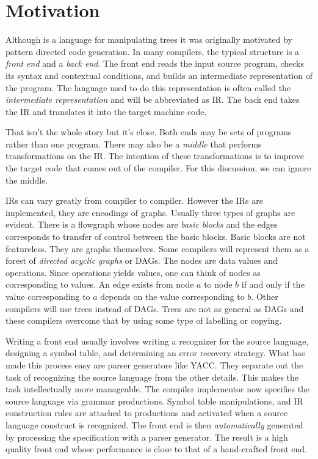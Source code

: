 \section{Motivation}

Although \Twiglang{} is a language for manipulating trees
it was originally motivated by
pattern directed code generation.  In many compilers, the typical
structure is a {\sl front end} and a {\sl back end}.  The front end reads
the input source program, checks its syntax and contextual conditions,
and builds an intermediate representation of the program.
The language used to do this representation is often called the
{\it intermediate representation} and will be abbreviated as IR.
The back end
takes the IR and translates it into the target machine code.

That isn't the whole story but it's close.  Both ends may be 
sets of programs rather than one
program.  There may also be a
{\it middle} that performs transformations on the
IR.  The intention of these
transformations is to improve the target code that comes out of the compiler.
For this discussion, we can ignore the middle.

IRs can vary greatly from compiler to compiler.
However the IRs are implemented, they are encodings of graphs.
Usually three types of graphs are evident\cite{dragon}.
There is a flowgraph whose nodes are {\sl basic blocks} and
the edges corresponds to transfer of control between the basic blocks.
Basic blocks are not featureless.  They are graphs themselves.
Some compilers will represent them as a forest of
{\it directed acyclic graphs} or DAGs.
The nodes are data values and operations.
Since operations yields values, one can think of nodes as
corresponding to values.  An edge exists from node $a$ to
node $b$ if and only if the value corresponding to $a$ depends on the
value corresponding to $b$.  Other compilers will use trees instead of DAGs.
Trees are not
as general as DAGs and these compilers overcome that by using some
type of labelling or copying.

Writing a front end usually
involves writing a recognizer
for the source language, designing a symbol table,
and determining an error recovery strategy.  What has made this process easy
are parser generators like YACC\cite{yacc}.
They separate out the task of recognizing the
source language from the other details.  This makes the task
intellectually more manageable.
The compiler implementor now specifies the source language via grammar
productions.  Symbol table manipulations,
and IR construction rules are attached to productions and activated
when a source language construct is recognized.
The front end is then {\it automatically} generated by processing the
specification with a parser generator.
The result is
a high quality front end whose performance is close to that of a
hand-crafted front end.

